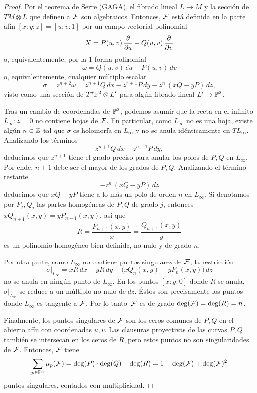 \begin{proof}
Por el teorema de Serre (GAGA), el fibrado lineal $L \to M$ y la sección de $TM \otimes L$ que definen a $\F$ son algebraicos. Entonces, $\F$ está definida en la parte afín $[x:y:z] = [u:v:1]$ por un campo vectorial polinomial
$$X = P(u,v) \, \p u + Q(u,v) \, \p v$$
o, equivalentemente, por la $1$-forma polinomial
$$\omega = Q(u,v) \, du - P(u,v) \, dv$$
o, equivalentemente, cualquier múltiplo escalar
$$\sigma = z^{n+2} \omega = z^{n+1} Q \, dx - z^{n+1} P \, dy - z^n \, (xQ - yP) \, dz,$$
visto como una sección de $T^\star \P^2 \otimes L'$ para algún fibrado lineal $L' \to \P^2$.

Tras un cambio de coordenadas de $\P^2$, podemos asumir que la recta en el infinito $L_\infty : z = 0$ no contiene hojas de $\F$. En particular, como $L_\infty$ no es una hoja, existe algún $n \in \Z$ tal que $\sigma$ es holomorfa en $L_\infty$ y no se anula idénticamente en $TL_\infty$. Analizando los términos
$$z^{n+1} Q \, dx - z^{n+1} P \, dy,$$
deducimos que $z^{n+1}$ tiene el grado preciso para anular los polos de $P, Q$ en $L_\infty$. Por ende, $n+1$ debe ser el mayor de los grados de $P, Q$. Analizando el término restante
$$- z^n \, (xQ - yP) \, dz$$
deducimos que $xQ - yP$ tiene a lo más un polo de orden $n$ en $L_\infty$. Si denotamos por $P_j, Q_j$ las partes homogéneas de $P, Q$ de grado $j$, entonces $xQ_{n+1}(x,y) = yP_{n+1}(x,y)$, así que
$$R = \dfrac {P_{n+1}(x,y)} x = \dfrac {Q_{n+1}(x,y)} y$$
es un polinomio homogéneo bien definido, no nulo y de grado $n$.

Por otra parte, como $L_\infty$ no contiene puntos singulares de $\F$, la restricción
$$\sigma \vert_{L_\infty} = xR \, dx - yR \, dy - \Big( xQ_n(x,y) - yP_n(x,y) \Big) \, dz$$
no se anula en ningún punto de $L_\infty$. En los puntos $[x:y:0]$ donde $R$ se anula, $\sigma \vert_{L_\infty}$ se reduce a un múltiplo no nulo de $dz$. Éstos son precisamente los puntos donde $L_\infty$ es tangente a $\F$. Por lo tanto, $\F$ es de grado $\deg(\F) = \deg(R) = n$.

Finalmente, los puntos singulares de $\F$ son los ceros comunes de $P, Q$ en el abierto afín con coordenadas $u, v$. Las clausuras proyectivas de las curvas $P, Q$ también se intersecan en los ceros de $R$, pero estos puntos no son singularidades de $\F$. Entonces, $\F$ tiene
$$\sum_{p \in \P^n} \mu_p(\F) = \deg(P) \cdot \deg(Q) - \deg(R) = 1 + \deg(\F) + \deg(\F)^2$$
puntos singulares, contados con multiplicidad.
\end{proof}
